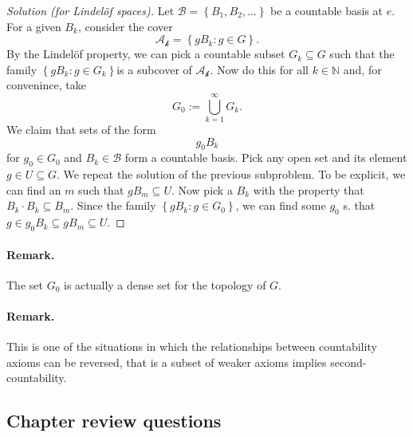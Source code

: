 \begin{proof}[Solution (for Lindel\"of spaces)]
    Let \( \mathcal{B} = \left\{ B_1, B_2, \ldots \right\} \) be a countable basis at \( e \). For a given \( B_k \), consider the cover
    \[ 
       \mathcal{A_k} = \left\{ gB_k : g \in G \right\}.
   \]
   By the Lindel\"of property, we can pick a countable subset \( G_k \subseteq G \) such that the family \( \left\{ gB_k : g \in G_k \right\} \)is a subcover of \( \mathcal{A_k} \). Now do this for all \( k \in \mathbb{N} \) and, for convenince, take
   \[ 
       G_0 := \bigcup_{k=1}^\infty G_k. 
  \]
  We claim that sets of the form
  \[ 
     g_0B_k 
 \]
 for \( g_0 \in G_0 \) and \( B_k \in \mathcal{B} \) form a countable basis. Pick any open set and its element \( g \in U \subseteq G \). We repeat the solution of the previous subproblem. To be explicit, we can find an \( m \) such that \( gB_m \subseteq U \). Now pick a \( B_k \) with the property that \( B_k \cdot B_k \subseteq B_m \). Since the family \( \left\{ gB_k : g \in G_0 \right\} \), we can find some \( g_0 \) s. that \( g \in g_0B_k \subseteq gB_m \subseteq U \).
\end{proof}

\paragraph{Remark.} The set \( G_0 \) is actually a dense set for the topology of \( G \).

\paragraph{Remark.} This is one of the situations in which the relationships between countability axioms can be reversed, that is a subset of weaker axioms implies second-countability.

\subsection{Chapter review questions}

